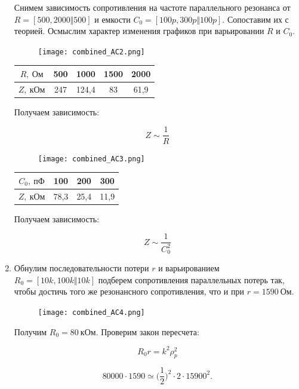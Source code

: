 \documentclass[a4paper, 12pt]{article}%
\begin{document}
\begin{enumerate}
Снимем зависимость сопротивления на частоте параллельного резонанса от $R = [500, 2000 \Vert 500]$ и емкости $C_0 = [100p, 300p \Vert 100p]$. Сопоставим их с теорией. Осмыслим характер изменения графиков при варьировании $R$ и $C_0$.

\begin{figure}[h!]
\centering
\texttt{[image: combined\_AC2.png]}
\label{fig:Image1}
\end{figure}

\begin{center}
\begin{tabular}{|c|c|c|c|c|}
\hline
$R, \: \textit{Ом}$ & 500 & 1000 & 1500 & 2000 \\
\hline
$Z, \: \textit{кОм}$ & 247 & 124,4 & 83 & 61,9 \\
\hline
\end{tabular}
\end{center}

Получаем зависимость:

\[Z \sim \frac{1}{R}\]

\begin{figure}[h!]
\centering
\texttt{[image: combined\_AC3.png]}
\label{fig:Image1}
\end{figure}

\begin{center}
\begin{tabular}{|c|c|c|c|}
\hline
$C_0, \: \textit{пФ}$ & 100 & 200 & 300 \\
\hline
$Z, \: \textit{кОм}$ & 78,3 & 25,4 & 11,9 \\
\hline
\end{tabular}
\end{center}

Получаем зависимость:

\[Z \sim \frac{1}{C_0^2}\]

\item Обнулим последовательности потери $r$ и варьированием $R_0 = [10k, 100k \Vert 10k]$ подберем сопротивления параллельных потерь так, чтобы достичь того же резонансного сопротивления, что и при $r = 1590 \: \textit{Ом}$.

\begin{figure}[h!]
\centering
\texttt{[image: combined\_AC4.png]}
\label{fig:Image1}
\end{figure}

Получим $R_0 = 80 \: \textit{кОм}$. Проверим закон пересчета:

\[R_0 r = k^2 \rho_p^2\]

\[80000 \cdot 1590 \simeq \Big(\frac{1}{2}\Big)^2 \cdot 2 \cdot 15900^2.\]


\end{enumerate}
\end{document}

